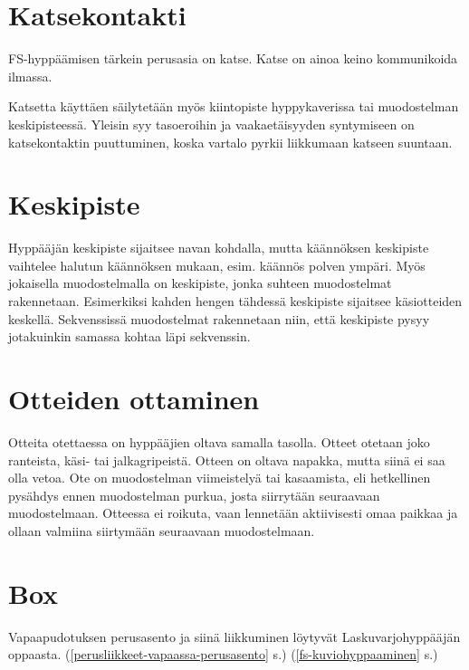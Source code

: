\section{ Katsekontakti }
\label{fs-hyppaamisen-perusteet-katsekontakti}


FS-hyppäämisen tärkein perusasia on katse. Katse on ainoa keino kommunikoida ilmassa. 


Katsetta käyttäen säilytetään myös kiintopiste hyppykaverissa tai muodostelman keskipisteessä. Yleisin syy tasoeroihin ja vaakaetäisyyden syntymiseen on katsekontaktin puuttuminen, koska vartalo pyrkii liikkumaan katseen suuntaan. 

\section{ Keskipiste }
\label{fs-hyppaamisen-perusteet-keskipiste}


Hyppääjän keskipiste sijaitsee navan kohdalla, mutta käännöksen keskipiste vaihtelee halutun käännöksen mukaan, esim. käännös polven ympäri. Myös jokaisella muodostelmalla on keskipiste, jonka suhteen muodostelmat rakennetaan. Esimerkiksi kahden hengen tähdessä keskipiste sijaitsee käsiotteiden keskellä. Sekvenssissä muodostelmat rakennetaan niin, että keskipiste pysyy jotakuinkin samassa kohtaa läpi sekvenssin. 

\section{ Otteiden ottaminen }
\label{fs-hyppaamisen-perusteet-otteiden-ottaminen}


Otteita otettaessa on hyppääjien oltava samalla tasolla. Otteet otetaan joko ranteista, käsi- tai jalkagripeistä. Otteen on oltava napakka, mutta siinä ei saa olla vetoa. Ote on muodostelman viimeistelyä tai kasaamista, eli hetkellinen pysähdys ennen muodostelman purkua, josta siirrytään seuraavaan muodostelmaan. Otteessa ei roikuta, vaan lennetään aktiivisesti omaa paikkaa ja ollaan valmiina siirtymään seuraavaan muodostelmaan. 

\section{ Box }
\label{fs-hyppaamisen-perusteet-box}


Vapaapudotuksen perusasento ja siinä liikkuminen löytyvät Laskuvarjohyppääjän oppaasta. (\ref{perusliikkeet-vapaassa-perusasento} s.\pageref{perusliikkeet-vapaassa-perusasento}) (\ref{fs-kuviohyppaaminen} s.\pageref{fs-kuviohyppaaminen}) 

